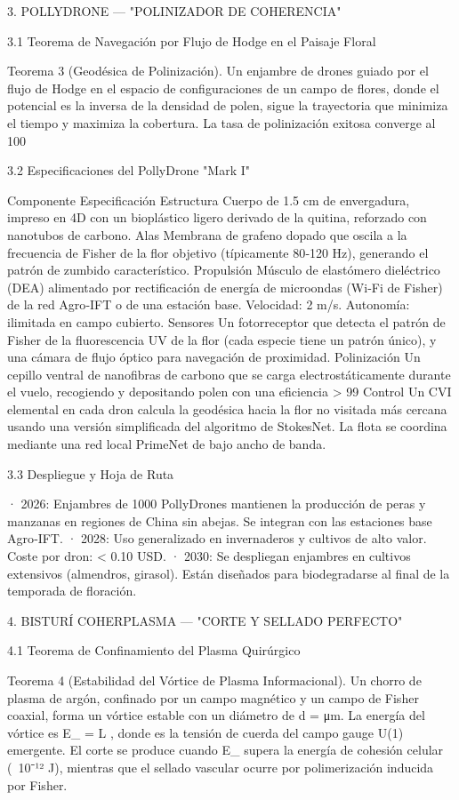 \documentclass[12pt,a4paper]{book}
\begin{document}
3. POLLYDRONE — "POLINIZADOR DE COHERENCIA"

3.1 Teorema de Navegación por Flujo de Hodge en el Paisaje Floral

Teorema 3 (Geodésica de Polinización). Un enjambre de drones guiado por el flujo de Hodge en el espacio de configuraciones de un campo de flores, donde el potencial es la inversa de la densidad de polen, sigue la trayectoria que minimiza el tiempo y maximiza la cobertura. La tasa de polinización exitosa converge al 100%

3.2 Especificaciones del PollyDrone "Mark I"

Componente Especificación
Estructura Cuerpo de 1.5 cm de envergadura, impreso en 4D con un bioplástico ligero derivado de la quitina, reforzado con nanotubos de carbono.
Alas Membrana de grafeno dopado que oscila a la frecuencia de Fisher de la flor objetivo (típicamente 80‑120 Hz), generando el patrón de zumbido característico.
Propulsión Músculo de elastómero dieléctrico (DEA) alimentado por rectificación de energía de microondas (Wi‑Fi de Fisher) de la red Agro‑IFT o de una estación base. Velocidad: 2 m/s. Autonomía: ilimitada en campo cubierto.
Sensores Un fotorreceptor que detecta el patrón de Fisher de la fluorescencia UV de la flor (cada especie tiene un patrón único), y una cámara de flujo óptico para navegación de proximidad.
Polinización Un cepillo ventral de nanofibras de carbono que se carga electrostáticamente durante el vuelo, recogiendo y depositando polen con una eficiencia > 99%
Control Un CVI elemental en cada dron calcula la geodésica hacia la flor no visitada más cercana usando una versión simplificada del algoritmo de StokesNet. La flota se coordina mediante una red local PrimeNet de bajo ancho de banda.

3.3 Despliegue y Hoja de Ruta

· 2026: Enjambres de 1000 PollyDrones mantienen la producción de peras y manzanas en regiones de China sin abejas. Se integran con las estaciones base Agro‑IFT.
· 2028: Uso generalizado en invernaderos y cultivos de alto valor. Coste por dron: < 0.10 USD.
· 2030: Se despliegan enjambres en cultivos extensivos (almendros, girasol). Están diseñados para biodegradarse al final de la temporada de floración.

4. BISTURÍ COHERPLASMA — "CORTE Y SELLADO PERFECTO"

4.1 Teorema de Confinamiento del Plasma Quirúrgico

Teorema 4 (Estabilidad del Vórtice de Plasma Informacional). Un chorro de plasma de argón, confinado por un campo magnético y un campo de Fisher coaxial, forma un vórtice estable con un diámetro de  d =    μm. La energía del vórtice es  E_{} = \sigma \cdot L , donde  \sigma  es la tensión de cuerda del campo gauge U(1) emergente. El corte se produce cuando  E_{}  supera la energía de cohesión celular (~10⁻¹² J), mientras que el sellado vascular ocurre por polimerización inducida por Fisher.
\end{document}
